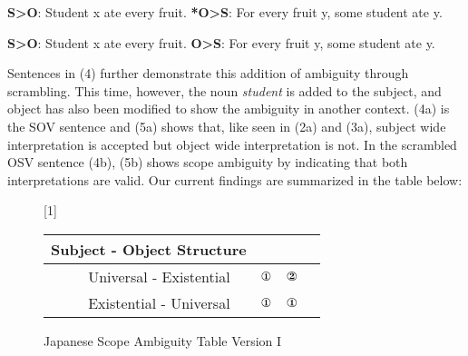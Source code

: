 \documentclass[english, 11pt]{article}
\newcommand{\onemeaning}{\text{\ding{172}}}
\newcommand{\twomeaning}{\text{\ding{173}}}
\begin{document}
\begin{exe}
	\ex 
	\begin{xlist}
		\label{1a}
		\label{1b}
	\end{xlist}
\end{exe}
\begin {exe}
	\ex 
		\begin {xlist}
			\ex 
				\begin {xlist}
					\ex \textbf{S>O}: Student x ate every fruit.\label{2ai}
					\ex \textbf{*O>S}: For every fruit y, some student ate y.\label{2aii}
				\end {xlist}
			\ex
				\begin {xlist} 
					\ex \textbf{S>O}: Student x ate every fruit.\label{2bi}
					\ex \textbf{O>S}: For every fruit y, some student ate y.\label{2bii}
				\end {xlist}
		\end {xlist}
\end {exe}
Sentences in (4) further demonstrate this addition of ambiguity through scrambling. This time, however, the noun \emph{student} is added to the subject, and object has also been modified to show the ambiguity in another context. (4a) is the SOV sentence and (5a) shows that, like seen in (2a) and (3a), subject wide interpretation is accepted but object wide interpretation is not. In the scrambled OSV sentence (4b), (5b) shows scope ambiguity by indicating that both interpretations are valid. Our current findings are summarized in the table below:
\begin{figure}[h]
	\begin{center} \renewcommand*\arraystretch{1.2}
	\scalebox{1}[1]{\begin{tabular}[t]{|rrl||c|c|c|} \hline 
	\multicolumn{3}{|c||}{Subject - Object Structure} & \sc{SOV} & \sc{OSV}  \\[0.5ex]
  	 	\hline & Universal - Existential 	& & $\onemeaning$ & $\twomeaning$ \\
		\hline & Existential - Universal 	& & $\onemeaning$ & $\onemeaning$ \\
   	 	\hline 
	\end{tabular}} \renewcommand*\arraystretch{1} \end{center}
	\vspace*{-5mm}
	\captionsetup{labelfont=bf}
	\caption[labelfont=bf]{Japanese Scope Ambiguity Table Version I}
\end{figure}
\end{document}
